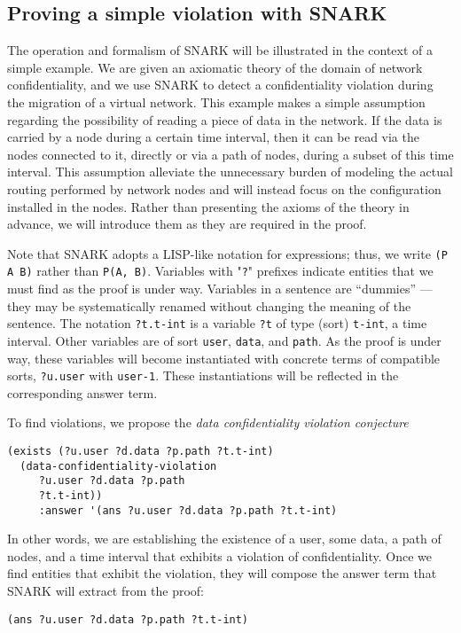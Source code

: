 \subsection{Proving a simple violation with SNARK}
\label{sec:find-violation}
The operation and formalism of SNARK will be illustrated in the context of a simple example.
We are given an axiomatic theory of the domain of network confidentiality, and we use SNARK to detect a confidentiality violation during the migration of a virtual network.
This example makes a simple assumption regarding the possibility of reading a piece of data in the network. If the data is carried by a node during a certain time interval, then it can be read via the nodes connected to it, directly or via a path of nodes, during a subset of this time interval.
This assumption alleviate the unnecessary burden of modeling the actual routing performed by network nodes and will instead focus on the configuration installed in the nodes.
Rather than presenting the axioms of the theory in advance, we will introduce them as they are required in the proof.

Note that SNARK adopts a LISP-like notation for expressions; thus, we write \verb'(P A B)' rather than \verb'P(A, B)'. 
Variables with "\verb'?'" prefixes indicate entities that we must find as the proof is under way.
Variables in a sentence are ``dummies'' \---- they may be systematically renamed without changing the meaning of the sentence. 
The notation \verb'?t.t-int' is a variable \verb'?t' of type (sort) \verb't-int', \ie a time interval. 
Other variables are of sort \verb'user', \verb'data', and \verb'path'.
As the proof is under way, these variables will become instantiated with concrete terms of compatible sorts, \eg \verb'?u.user' with \verb'user-1'. 
These instantiations will be reflected in the corresponding answer term.

To find violations, we propose the \textit{data confidentiality violation conjecture}

\begin{lstlisting}[numbers=none] 
(exists (?u.user ?d.data ?p.path ?t.t-int)
  (data-confidentiality-violation 
     ?u.user ?d.data ?p.path 
     ?t.t-int))
     :answer '(ans ?u.user ?d.data ?p.path ?t.t-int)
\end{lstlisting}

In other words, we are establishing the existence of  a user, some data, a path of nodes, and a time interval that exhibits a violation of confidentiality. 
Once we find entities that exhibit the violation, they will compose the answer term that SNARK will extract from the proof:  
  \begin{lstlisting}[numbers=none] 
     (ans ?u.user ?d.data ?p.path ?t.t-int)
  \end{lstlisting}


